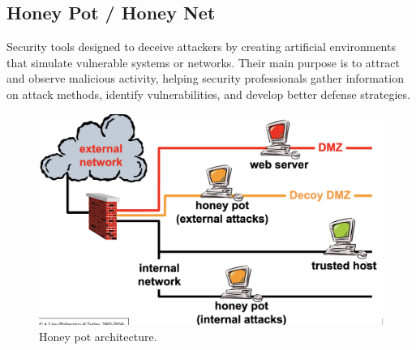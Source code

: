 \subsection{Honey Pot / Honey Net}
Security tools designed to deceive attackers by creating artificial environments that simulate vulnerable systems or networks. Their main purpose is to attract and observe malicious activity, helping security professionals gather information on attack methods, identify vulnerabilities, and develop better defense strategies.

\begin{figure}[H]
    \centering
    \includegraphics[width=\linewidth]{Images/Firewalling/honey_pot.png}
    \caption{Honey pot architecture.}
\end{figure}